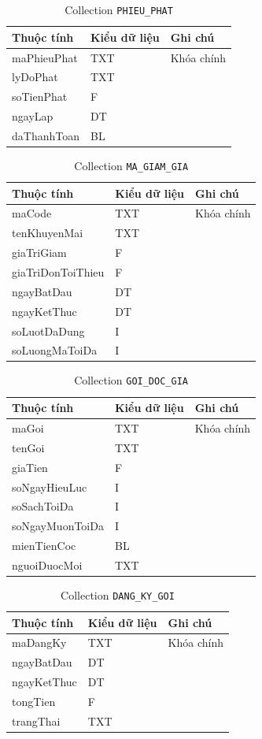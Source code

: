 \documentclass[../main.tex]{subfiles}
\begin{document}
\begin{longtable}{|p{5.7cm}|p{2.4cm}|p{5.2cm}|}
\caption{Collection \texttt{PHIEU\_PHAT}}\\
\hline
\textbf{Thuộc tính} & \textbf{Kiểu dữ liệu} & \textbf{Ghi chú} \\
\hline
maPhieuPhat & TXT & Khóa chính \\
\hline
lyDoPhat & TXT &  \\
\hline
soTienPhat & F &  \\
\hline
ngayLap & DT &  \\
\hline
daThanhToan & BL &  \\
\hline
\end{longtable}

\begin{longtable}{|p{5.7cm}|p{2.4cm}|p{5.2cm}|}
\caption{Collection \texttt{MA\_GIAM\_GIA}}\\
\hline
\textbf{Thuộc tính} & \textbf{Kiểu dữ liệu} & \textbf{Ghi chú} \\
\hline
maCode & TXT & Khóa chính \\
\hline
tenKhuyenMai & TXT &  \\
\hline
giaTriGiam & F &  \\
\hline
giaTriDonToiThieu & F &  \\
\hline
ngayBatDau & DT &  \\
\hline
ngayKetThuc & DT &  \\
\hline
soLuotDaDung & I &  \\
\hline
soLuongMaToiDa & I &  \\
\hline
\end{longtable}

\begin{longtable}{|p{5.7cm}|p{2.4cm}|p{5.2cm}|}
\caption{Collection \texttt{GOI\_DOC\_GIA}}\\
\hline
\textbf{Thuộc tính} & \textbf{Kiểu dữ liệu} & \textbf{Ghi chú} \\
\hline
maGoi & TXT & Khóa chính \\
\hline
tenGoi & TXT &  \\
\hline
giaTien & F &  \\
\hline
soNgayHieuLuc & I &  \\
\hline
soSachToiDa & I &  \\
\hline
soNgayMuonToiDa & I &  \\
\hline
mienTienCoc & BL &  \\
\hline
nguoiDuocMoi & TXT &  \\
\hline
\end{longtable}

\begin{longtable}{|p{5.7cm}|p{2.4cm}|p{5.2cm}|}
\caption{Collection \texttt{DANG\_KY\_GOI}}\\
\hline
\textbf{Thuộc tính} & \textbf{Kiểu dữ liệu} & \textbf{Ghi chú} \\
\hline
maDangKy & TXT & Khóa chính \\
\hline
ngayBatDau & DT &  \\
\hline
ngayKetThuc & DT &  \\
\hline
tongTien & F &  \\
\hline
trangThai & TXT &  \\
\hline
\end{longtable}
\endgroup
\end{document}
